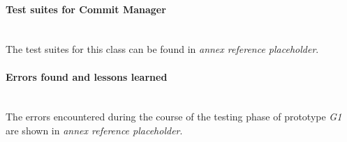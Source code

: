 \paragraph{Test suites for Commit Manager}\mbox{}\\

The test suites for this class can be found in \emph{annex reference placeholder}. %

\paragraph{Errors found and lessons learned}\mbox{}\\

The errors encountered during the course of the testing phase of prototype \emph{G1} are shown in \emph{annex reference placeholder}. %


